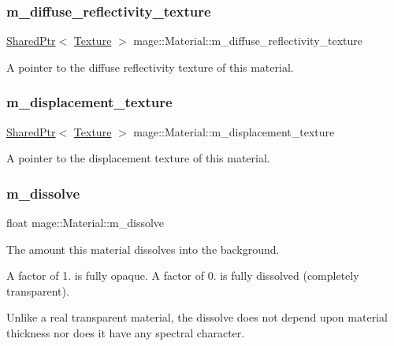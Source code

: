\subsubsection{\texorpdfstring{m\+\_\+diffuse\+\_\+reflectivity\+\_\+texture}{m\_diffuse\_reflectivity\_texture}}
{\footnotesize\ttfamily \hyperlink{namespacemage_a1e01ae66713838a7a67d30e44c67703e}{Shared\+Ptr}$<$ \hyperlink{classmage_1_1_texture}{Texture} $>$ mage\+::\+Material\+::m\+\_\+diffuse\+\_\+reflectivity\+\_\+texture}

A pointer to the diffuse reflectivity texture of this material. \hypertarget{structmage_1_1_material_a04ca0a2efe12529ae0ea91e9cb622ade}{}\label{structmage_1_1_material_a04ca0a2efe12529ae0ea91e9cb622ade} 
\subsubsection{\texorpdfstring{m\+\_\+displacement\+\_\+texture}{m\_displacement\_texture}}
{\footnotesize\ttfamily \hyperlink{namespacemage_a1e01ae66713838a7a67d30e44c67703e}{Shared\+Ptr}$<$ \hyperlink{classmage_1_1_texture}{Texture} $>$ mage\+::\+Material\+::m\+\_\+displacement\+\_\+texture}

A pointer to the displacement texture of this material. \hypertarget{structmage_1_1_material_a42b435ea58ce7da4b48febe9bb33aba7}{}\label{structmage_1_1_material_a42b435ea58ce7da4b48febe9bb33aba7} 
\subsubsection{\texorpdfstring{m\+\_\+dissolve}{m\_dissolve}}
{\footnotesize\ttfamily float mage\+::\+Material\+::m\+\_\+dissolve}

The amount this material dissolves into the background.

A factor of 1. is fully opaque. A factor of 0. is fully dissolved (completely transparent).

Unlike a real transparent material, the dissolve does not depend upon material thickness nor does it have any spectral character. \hypertarget{structmage_1_1_material_aa68e02ed3da6000effc3aadcc99fa4b5}{}\label{structmage_1_1_material_aa68e02ed3da6000effc3aadcc99fa4b5} 
